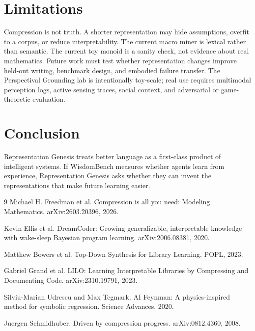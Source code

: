 \documentclass[11pt]{article}
\begin{document}
\section{Limitations}

Compression is not truth.
A shorter representation may hide assumptions, overfit to a corpus, or reduce interpretability.
The current macro miner is lexical rather than semantic.
The current toy monoid is a sanity check, not evidence about real mathematics.
Future work must test whether representation changes improve held-out writing, benchmark design, and embodied failure transfer.
The Perspectival Grounding lab is intentionally toy-scale; real use requires multimodal perception logs, active sensing traces, social context, and adversarial or game-theoretic evaluation.

\section{Conclusion}

Representation Genesis treats better language as a first-class product of intelligent systems.
If WisdomBench measures whether agents learn from experience, Representation Genesis asks whether they can invent the representations that make future learning easier.

\begin{thebibliography}{9}
Michael H. Freedman et al.
\newblock Compression is all you need: Modeling Mathematics.
\newblock arXiv:2603.20396, 2026.

Kevin Ellis et al.
\newblock DreamCoder: Growing generalizable, interpretable knowledge with wake-sleep Bayesian program learning.
\newblock arXiv:2006.08381, 2020.

Matthew Bowers et al.
\newblock Top-Down Synthesis for Library Learning.
\newblock POPL, 2023.

Gabriel Grand et al.
\newblock LILO: Learning Interpretable Libraries by Compressing and Documenting Code.
\newblock arXiv:2310.19791, 2023.

Silviu-Marian Udrescu and Max Tegmark.
\newblock AI Feynman: A physics-inspired method for symbolic regression.
\newblock Science Advances, 2020.

Juergen Schmidhuber.
\newblock Driven by compression progress.
\newblock arXiv:0812.4360, 2008.
\end{thebibliography}
\end{document}
